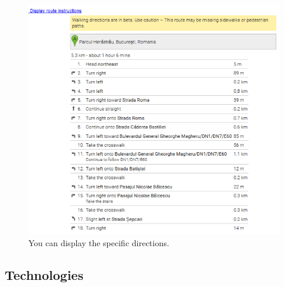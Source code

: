 		\begin{figure}[h!]
			\centering
			\includegraphics[scale=0.9]{input/instructions.png}
			\caption{\label{fig:instructions}You can display the specific directions.}
		\end{figure}
		
		\subsection{Technologies}

